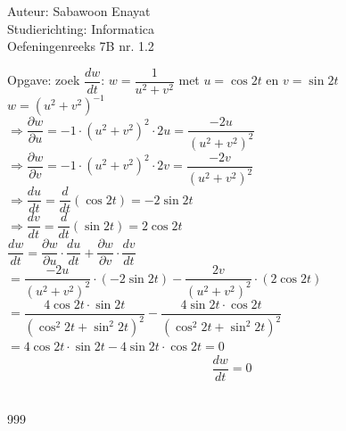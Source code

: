 \documentclass[a4paper]{article}
\begin{document}
  
\noindent \large Auteur: Sabawoon Enayat      \\
\noindent \large Studierichting: Informatica  \\
\noindent \large Oefeningenreeks 7B nr. 1.2 \\

\newcommand{\llim}{\lim\limits}

\medskip

\normalsize

Opgave: zoek $\dfrac{dw}{dt}$: $w = \dfrac{1}{u^2 + v^2}$ met $u = \cos 2t$ en $v = \sin 2t$\\

$w = \left(u^2 + v^2\right)^{-1}$\\

$\Rightarrow \dfrac{\partial w}{\partial u} = -1\cdot\left(u^2 + v^2\right)^2\cdot 2u = \dfrac{-2u}{\left(u^2 + v^2\right)^2}$\\

$\Rightarrow \dfrac{\partial w}{\partial v} = -1\cdot\left(u^2 + v^2\right)^2\cdot 2v = \dfrac{-2v}{\left(u^2 + v^2\right)^2}$\\

$\Rightarrow \dfrac{du}{dt} = \dfrac{d}{dt}\left(\cos 2t\right) = -2\sin 2t$\\

$\Rightarrow \dfrac{dv}{dt} = \dfrac{d}{dt}\left(\sin 2t\right) = 2\cos 2t$\\

$\dfrac{dw}{dt} = \dfrac{\partial w}{\partial u}\cdot\dfrac{du}{dt} + \dfrac{\partial w}{\partial v}\cdot\dfrac{dv}{dt}$\\

$= \dfrac{-2u}{\left(u^2 + v^2\right)^2} \cdot (-2\sin 2t) - \dfrac{2v}{\left(u^2 + v^2\right)^2} \cdot (2\cos 2t)$\\

$= \dfrac{4\cos 2t\cdot \sin 2t}{\left(\cos^2 2t + \sin^2 2t\right)^2} - \dfrac{4\sin 2t\cdot \cos 2t}{\left(\cos^2 2t + \sin^2 2t\right)^2}$\\

$= 4\cos 2t\cdot \sin 2t - 4\sin 2t\cdot \cos 2t = 0$\\

$$\dfrac{dw}{dt} = 0$$\\

\begin{thebibliography}{999}
\end{thebibliography}
\end{document}
